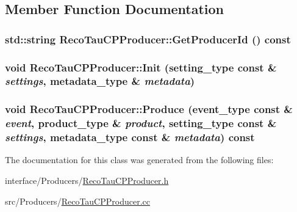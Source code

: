 \subsection{Member Function Documentation}
\hypertarget{classRecoTauCPProducer_a3483e9744cae5ee542fb31201cd48d1f}{
\subsubsection[{GetProducerId}]{\setlength{\rightskip}{0pt plus 5cm}std::string RecoTauCPProducer::GetProducerId () const}}
\label{classRecoTauCPProducer_a3483e9744cae5ee542fb31201cd48d1f}
\hypertarget{classRecoTauCPProducer_aa004bd0b3ab64ec7c59d5b8cc7d874ab}{
\subsubsection[{Init}]{\setlength{\rightskip}{0pt plus 5cm}void RecoTauCPProducer::Init (setting\_\-type const \& {\em settings}, \/  metadata\_\-type \& {\em metadata})}}
\label{classRecoTauCPProducer_aa004bd0b3ab64ec7c59d5b8cc7d874ab}
\hypertarget{classRecoTauCPProducer_a23fae79696944e8a9762096cb982caca}{
\subsubsection[{Produce}]{\setlength{\rightskip}{0pt plus 5cm}void RecoTauCPProducer::Produce (event\_\-type const \& {\em event}, \/  product\_\-type \& {\em product}, \/  setting\_\-type const \& {\em settings}, \/  metadata\_\-type const \& {\em metadata}) const}}
\label{classRecoTauCPProducer_a23fae79696944e8a9762096cb982caca}


The documentation for this class was generated from the following files:\begin{DoxyCompactItemize}
\item 
interface/Producers/\hyperlink{RecoTauCPProducer_8h}{RecoTauCPProducer.h}\item 
src/Producers/\hyperlink{RecoTauCPProducer_8cc}{RecoTauCPProducer.cc}\end{DoxyCompactItemize}
